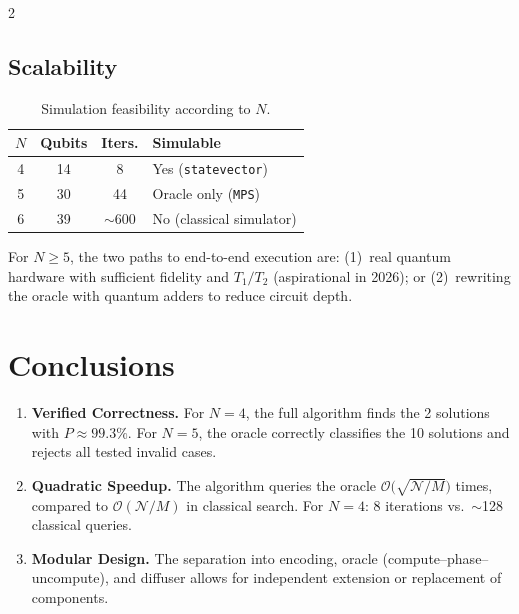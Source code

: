 \documentclass[9pt, a4paper]{extarticle}
\newcommand{\BigO}{\mathcal{O}}
\begin{document}
\begin{multicols}{2}
\subsection{Scalability}

\begin{table}[H]
    \centering
    \caption{Simulation feasibility according to $N$.}
    \label{tab:scale}
    \scriptsize
    \begin{tabular}{@{}cccl@{}}
        \toprule
        $N$ & Qubits & Iters. & Simulable \\
        \midrule
        4 & 14 & 8    & Yes (\texttt{statevector}) \\
        5 & 30 & 44   & Oracle only (\texttt{MPS}) \\
        6 & 39 & $\sim$600 & No (classical simulator) \\
        \bottomrule
    \end{tabular}
\end{table}

For $N \geq 5$, the two paths to end-to-end execution are:
(1)~real quantum hardware with sufficient fidelity and $T_1/T_2$
(aspirational in 2026); or (2)~rewriting the oracle with quantum adders to
reduce circuit depth.

\section{Conclusions}

\begin{enumerate}
    \item \textbf{Verified Correctness.}
          For $N\!=\!4$, the full algorithm finds the 2 solutions with $P \approx 99.3\%$.
          For $N\!=\!5$, the oracle correctly classifies the 10 solutions and rejects
          all tested invalid cases.

    \item \textbf{Quadratic Speedup.}
          The algorithm queries the oracle $\BigO\!\big(\sqrt{\mathcal{N}/M}\big)$ times,
          compared to $\BigO(\mathcal{N}/M)$ in classical search.
          For $N\!=\!4$: 8 iterations vs.\ $\sim$128 classical queries.

    \item \textbf{Modular Design.}
          The separation into encoding, oracle (compute--phase--uncompute), and
          diffuser allows for independent extension or replacement of components.


\end{enumerate}
\end{multicols}
\end{document}
